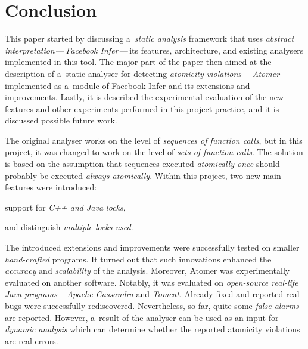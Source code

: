 
\section{Conclusion}
\label{sec:conc}

This paper started by discussing a~\emph{static analysis} framework that uses
\emph{abstract interpretation}\,---\,\emph{Facebook Infer}\,---\,its features,
architecture, and existing analysers implemented in this tool. The major part
of the paper then aimed at the description of a~static analyser for detecting
\emph{atomicity violations}\,---\,\emph{Atomer}\,---\,implemented as a~module
of Facebook Infer and its extensions and improvements. Lastly, it is described
the experimental evaluation of the new features and other experiments performed
in this project practice, and it is discussed possible future work.

The original analyser works on the level of \emph{sequences of function calls},
but in this project, it was changed to work on the level of \emph{sets of
function calls}. The solution is based on the assumption that sequences
executed \emph{atomically once} should probably be executed \emph{always
atomically}. Within this project, two new main features were introduced:
\begin{enumerate*}[label={(\roman*)}]
    \item
        support for \emph{C++ and Java locks},

    \item
        and distinguish \emph{multiple locks used}.
\end{enumerate*}

The introduced extensions and improvements were successfully tested on
smaller \emph{hand-crafted} programs. It turned out that such innovations
enhanced the \emph{accuracy} and \emph{scalability} of the analysis. Moreover,
Atomer was experimentally evaluated on another software. Notably, it was
evaluated on \emph{open-source real-life Java programs}\,--\,\emph{
Apache Cassandra} and \emph{Tomcat}. Already fixed and reported real bugs
were successfully rediscovered. Nevertheless, so far, quite some \emph{false
alarms} are reported. However, a~result of the analyser can be used as an
input for \emph{dynamic analysis} which can determine whether the reported
atomicity violations are real errors.


